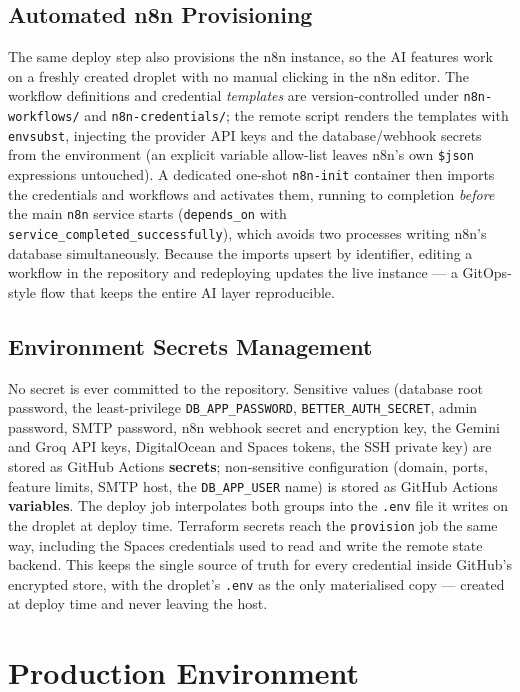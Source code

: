 \documentclass[12pt, a4paper, oneside]{report}
\begin{document}
\subsection{Automated n8n Provisioning}

The same deploy step also provisions the n8n instance, so the AI
features work on a freshly created droplet with no manual clicking in
the n8n editor. The workflow definitions and credential
\emph{templates} are version-controlled under
\texttt{n8n-workflows/} and \texttt{n8n-credentials/}; the remote
script renders the templates with \texttt{envsubst}, injecting the
provider API keys and the database/webhook secrets from the
environment (an explicit variable allow-list leaves n8n's own
\texttt{\$json} expressions untouched). A dedicated one-shot
\texttt{n8n-init} container then imports the credentials and
workflows and activates them, running to completion \emph{before} the
main \texttt{n8n} service starts (\texttt{depends\_on} with
\texttt{service\_completed\_successfully}), which avoids two processes
writing n8n's database simultaneously. Because the imports upsert by
identifier, editing a workflow in the repository and redeploying
updates the live instance --- a GitOps-style flow that keeps the
entire AI layer reproducible.

\subsection{Environment Secrets Management}

No secret is ever committed to the repository. Sensitive values
(database root password, the least-privilege \texttt{DB\_APP\_PASSWORD},
\texttt{BETTER\_AUTH\_SECRET}, admin password,
SMTP password, n8n webhook secret and encryption key, the Gemini and
Groq API keys, DigitalOcean and Spaces tokens, the SSH private key)
are stored as GitHub Actions
\textbf{secrets}; non-sensitive configuration (domain, ports, feature
limits, SMTP host, the \texttt{DB\_APP\_USER} name) is stored as GitHub
Actions \textbf{variables}.
The deploy job interpolates both groups into the \texttt{.env} file it
writes on the droplet at deploy time. Terraform secrets reach the
\texttt{provision} job the same way, including the Spaces credentials
used to read and write the remote state backend. This keeps the
single source of truth for every credential inside GitHub's encrypted
store, with the droplet's \texttt{.env} as the only materialised copy
--- created at deploy time and never leaving the host.

\section{Production Environment}
\end{document}

